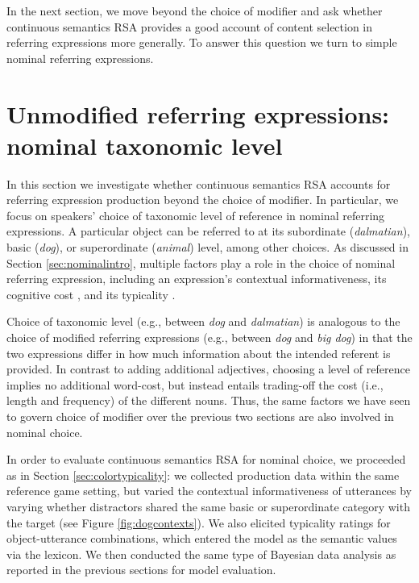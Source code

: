 \documentclass[11pt]{article}
\newcommand{\figref}[1]{Figure \ref{#1}}
\newcommand{\sectionref}[1]{Section \ref{#1}}
\begin{document}
In the next section, we move beyond the choice of modifier and ask whether continuous semantics RSA provides a good account of content selection in referring expressions more generally. To answer this question we turn to simple nominal referring expressions.

\section{Unmodified referring expressions: nominal taxonomic level}
\label{sec:nominal}

In this section we investigate whether continuous semantics RSA accounts for referring expression production beyond the choice of modifier. In particular, we focus on speakers' choice of taxonomic level of reference in nominal referring expressions. A particular object can be referred to at its subordinate (\emph{dalmatian}), basic (\emph{dog}), or superordinate (\emph{animal}) level, among other choices. As discussed in \sectionref{sec:nominalintro},  multiple factors play a role in the choice of nominal referring expression, including an expression's contextual informativeness, its cognitive cost \cite<short and frequent terms are preferred over long and infrequent ones,>{griffin1998,jescheniak1994}, and its typicality \cite<an utterance is more likely to be used if the object is a good instance of it,> {Jolicoeur1984}.

Choice of taxonomic level (e.g., between \emph{dog} and \emph{dalmatian}) is analogous to the choice of modified referring expressions (e.g., between \emph{dog} and \emph{big dog}) in that the two expressions differ in how much information about the intended referent is provided. In contrast to adding additional adjectives, choosing a level of reference implies no additional word-cost, but instead entails trading-off the cost (i.e., length and frequency) of the different nouns. Thus, the same factors we have seen to govern choice of modifier over the previous two sections are also involved in nominal choice.

In order to evaluate continuous semantics RSA for nominal choice, we proceeded as in \sectionref{sec:colortypicality}: we collected production data within the same reference game setting, but varied the contextual informativeness of utterances by varying whether distractors shared the same basic or superordinate category with the target (see \figref{fig:dogcontexts}). We also elicited typicality ratings for object-utterance combinations, which entered the model as the semantic values via the lexicon. We then conducted the same type of Bayesian data analysis as reported in the previous sections for model evaluation.
\end{document}
